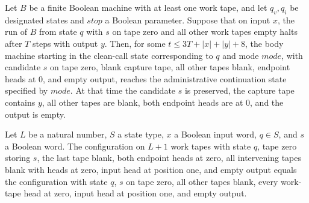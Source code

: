 \begin{lemma}
\label{Complexity.enumCont_body_call}
\leanok
{}
Let $B$ be a finite Boolean machine with at least one work tape, and let $q_v,q_i$ be
designated states and $stop$ a Boolean parameter. Suppose that on input $x$, the run of
$B$ from state $q$ with $s$ on tape zero and all other work tapes empty halts after $T$
steps with output $y$. Then, for some $t\le 3T+|x|+|y|+8$, the body machine starting in
the clean-call state corresponding to $q$ and mode $mode$, with candidate $s$ on tape
zero, blank capture tape, all other tapes blank, endpoint heads at $0$, and empty
output, reaches the administrative continuation state specified by $mode$. At that time
the candidate $s$ is preserved, the capture tape contains $y$, all other tapes are
blank, both endpoint heads are at $0$, and the output is empty.
\end{lemma}

\begin{lemma}
\label{Complexity.enumCont_pair_words}
\leanok
{}
Let $L$ be a natural number, $S$ a state type, $x$ a Boolean input word, $q\in S$, and
$s$ a Boolean word. The configuration on $L+1$ work tapes with state $q$, tape zero
storing $s$, the last tape blank, both endpoint heads at zero, all intervening tapes
blank with heads at zero, input head at position one, and empty output equals the
configuration with state $q$, $s$ on tape zero, all other tapes blank, every work-tape
head at zero, input head at position one, and empty output.
\end{lemma}

